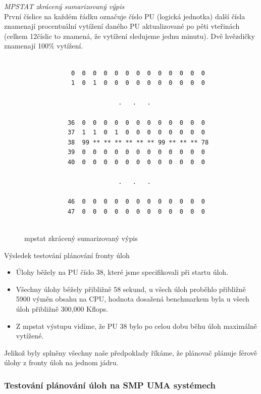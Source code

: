 \documentclass[
  field=ainfk,
  biblatex,
  glossaries,
  index
]{kidiplom}
\begin{document}
\noindent
\textit{MPSTAT zkrácený sumarizovaný výpis} \\ 

První číslice na každém řádku označuje číslo PU (logická jednotka) další čísla znamenají procentuální vytížení daného PU aktualizované po pěti vteřinách (celkem 12číslic to znamená, že vytížení sledujeme jednu minutu). Dvě hvězdičky znamenají 100\% vytížení. 

\begin{figure}[ht]
\caption{mpstat zkrácený sumarizovaný výpis}
\center
\label{mpstat1}

\begin{Verbatim}[frame=single]

             0  0  0  0  0  0  0  0  0  0  0  0  0
             1  0  1  0  0  0  0  0  0  0  0  0  0
            
                          .   .   .
           
            36  0  0  0  0  0  0  0  0  0  0  0  0
            37  1  1  0  1  0  0  0  0  0  0  0  0
            38  99 ** ** ** ** ** ** 99 ** ** ** 78
            39  0  0  0  0  0  0  0  0  0  0  0  0
            40  0  0  0  0  0  0  0  0  0  0  0  0
           
                          .   .   .
           
            46  0  0  0  0  0  0  0  0  0  0  0  0
            47  0  0  0  0  0  0  0  0  0  0  0  0
           
\end{Verbatim}
\end{figure}

\noindent
Výsledek testování plánování fronty úloh
\begin{itemize}
\item Úlohy běžely na PU číslo 38, které jsme specifikovali při startu úloh.
\item Všechny úlohy běžely přibližně 58 sekund, u všech úloh proběhlo přibližně 5900 výměn obsahu na CPU, hodnota dosažená benchmarkem byla u všech úloh přibližně 300,000 Kflops.
\item Z mpstat výstupu vidíme, že PU 38 bylo po celou dobu běhu úloh maximálně vytížené.
\end{itemize}

Jelikož byly splněny všechny naše předpoklady říkáme, že plánovač plánuje férově úlohy z fronty úloh na jednom jádru.

\subsubsection{Testování plánování úloh na SMP UMA systémech}
\end{document}
